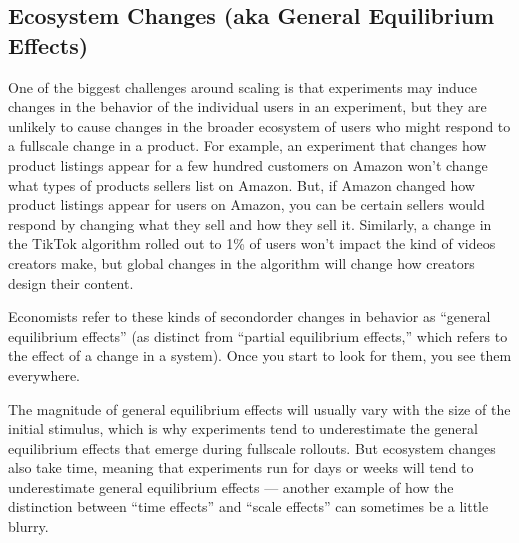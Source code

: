 \documentclass[letterpaper,10pt,english]{jupyterBook}
\begin{document}
\subsection{Ecosystem Changes (aka General Equilibrium Effects)}
\label{\detokenize{30_questions/45_causal_questions_external:ecosystem-changes-aka-general-equilibrium-effects}}
\sphinxAtStartPar
One of the biggest challenges around scaling is that experiments may induce changes in the behavior of the individual users in an experiment, but they are unlikely to cause changes in the broader ecosystem of users who might respond to a full\sphinxhyphen{}scale change in a product. For example, an experiment that changes how product listings appear for a few hundred customers on Amazon won’t change what types of products sellers list on Amazon. But, if Amazon changed how product listings appear for  users on Amazon, you can be certain sellers would respond by changing what they sell and how they sell it. Similarly, a change in the TikTok algorithm rolled out to 1\% of users won’t impact the kind of videos creators make, but global changes in the algorithm will  change how creators design their content.

\sphinxAtStartPar
Economists refer to these kinds of second\sphinxhyphen{}order changes in behavior as “general equilibrium effects” (as distinct from “partial equilibrium effects,” which refers to the  effect of a change in a system). Once you start to look for them, you see them everywhere.

\sphinxAtStartPar
The magnitude of general equilibrium effects will usually vary with the size of the initial stimulus, which is why experiments tend to underestimate the general equilibrium effects that emerge during full\sphinxhyphen{}scale rollouts. But ecosystem changes also take time, meaning that experiments run for days or weeks will tend to underestimate general equilibrium effects — another example of how the distinction between “time effects” and “scale effects” can sometimes be a little blurry.
\end{document}
